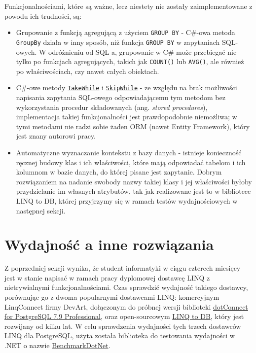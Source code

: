 Funkcjonalnościami, które są ważne, lecz niestety nie zostały zaimplementowane z powodu ich trudności, są:

\begin{itemize}
\item Grupowanie z funkcją agregującą z użyciem \texttt{GROUP BY} - C\#-owa metoda \texttt{GroupBy} działa w inny sposób, niż funkcja \texttt{GROUP BY} w zapytaniach SQL-owych. W odróżnieniu od SQL-a, grupowanie w C\# może przebiegać nie tylko po funkcjach agregujących, takich jak \texttt{COUNT()} lub \texttt{AVG()}, ale również po właściwościach, czy nawet całych obiektach.
\item C\#-owe metody \href{https://msdn.microsoft.com/pl-pl/library/bb534804(v=vs.110).aspx}{\texttt{TakeWhile}} i \href{https://www.google.pl/url?sa=t&rct=j&q=&esrc=s&source=web&cd=1&cad=rja&uact=8&ved=0ahUKEwj43ai66LPUAhVCVhQKHSm4BfkQFggnMAA&url=https%3A%2F%2Fmsdn.microsoft.com%2Fpl-pl%2Flibrary%2Fbb549075(v%3Dvs.110).aspx&usg=AFQjCNHEbD9WVhCdEeCDPQw0CIt845i9Kg&sig2=41OZNQAxqA1IYG9QzuzK1g}{\texttt{SkipWhile}} - ze względu na brak możliwości napisania zapytania SQL-owego odpowiadającemu tym metodom bez wykorzystania procedur składowanych (ang. \textit{stored procedures}), implementacja takiej funkcjonalności jest prawdopodobnie niemożliwa; w tymi metodami nie radzi sobie żaden ORM (nawet Entity Framework), który jest znany autorowi pracy.
\item Automatyczne wyznaczanie kontekstu z bazy danych - istnieje konieczność ręcznej budowy klas i ich właściwości, które mają odpowiadać tabelom i ich kolumnom w bazie danych, do której pisane jest zapytanie. Dobrym rozwiązaniem na nadanie swobody nazwy takiej klasy i jej właściwości byłoby przydzielanie im własnych atrybutów, tak jak realizowane jest to w bibliotece LINQ to DB, której przyjrzymy się w ramach testów wydajnościowych w następnej sekcji.
\end{itemize}

\newpage

\section{Wydajność a inne rozwiązania}
Z poprzedniej sekcji wynika, że student informatyki w ciągu czterech miesięcy jest w stanie napisać w ramach pracy dyplomowej dostawcę LINQ z nietrywialnymi funkcjonalnościami. Czas sprawdzić wydajność takiego dostawcy, porównując go z dwoma popularnymi dostawcami LINQ: komercyjnym LinqConnect firmy DevArt, dołączonym do próbnej wersji biblioteki \href{https://www.devart.com/dotconnect/postgresql/}{dotConnect for PostgreSQL 7.9 Professional}, oraz open-sourcowym \href{https://github.com/linq2db/linq2db}{LINQ to DB}, który jest rozwijany od kilku lat. W celu sprawdzenia wydajności tych trzech dostawców LINQ dla PostgreSQL, użyta została biblioteka do testowania wydajności w .NET o nazwie \href{https://github.com/dotnet/BenchmarkDotNet}{BenchmarkDotNet}.

